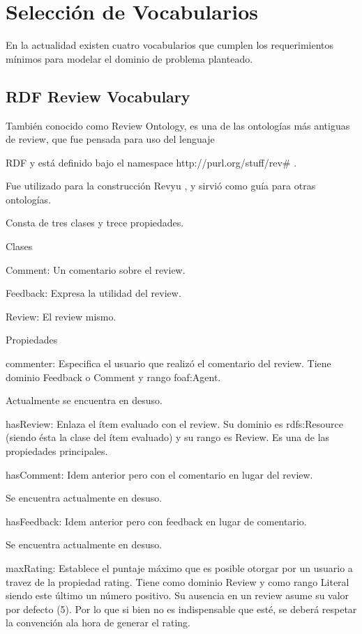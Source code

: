 \chapter{Selección de Vocabularios}
\label{chapter:seleccion}

En la actualidad existen cuatro vocabularios que cumplen los requerimientos mínimos para modelar el dominio de problema planteado.

\section{RDF Review Vocabulary}
\label{section:review-ontology}

También conocido como Review Ontology, es una de las ontologías más antiguas de review, que fue pensada para uso del lenguaje 

RDF y está definido bajo el namespace http://purl.org/stuff/rev\# .

Fue utilizado para la construcción Revyu , y sirvió como guía para otras ontologías.

Consta de tres clases y trece propiedades.

Clases

Comment: Un comentario sobre el review. 

Feedback: Expresa la utilidad del review. 


Review: El review mismo. 


Propiedades


commenter: Especifica el usuario que realizó el comentario del review. Tiene dominio Feedback o Comment y rango foaf:Agent.


Actualmente se encuentra en desuso.


hasReview: Enlaza el ítem evaluado con el review. Su dominio es rdfs:Resource (siendo ésta la clase del ítem evaluado) y su rango es Review. Es una de 
las propiedades principales. 


hasComment: Idem anterior pero con el comentario en lugar del review.

Se encuentra actualmente en desuso.

hasFeedback: Idem anterior pero con feedback en lugar de comentario.

Se encuentra actualmente en desuso.


maxRating: Establece el puntaje máximo que es posible otorgar por un usuario a travez de la propiedad rating. Tiene como dominio 
Review y como rango Literal siendo este último un número positivo. Su ausencia en un review asume su valor por defecto (5). Por lo que 
si bien no es indispensable que esté, se deberá respetar la convención ala hora de generar el rating.



